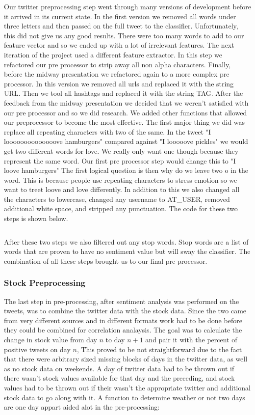 \documentclass{acm_proc_article-sp}
\begin{document}
Our twitter preprocessing step went through many versions of development before
it arrived in its current state. In the first version we removed all words
under three letters and then passed on the full tweet to the classifier.
Unfortunately, this did not give us any good results. There were too many words
to add to our feature vector and so we ended up with a lot of irrelevant
features. The next iteration of the project used a different feature extractor.
In this step we refactored our pre processor to strip away all non alpha
characters. Finally, before the midway presentation we refactored again to a
more complex pre processor. In this version we removed all urls and replaced it
with the string URL. Then we tool all hashtags and replaced it with the string
TAG. After the feedback from the midway presentation we decided that we weren't
satisfied with our pre processor and so we did research.  We added other
functions that allowed our preprocessor to become the most effective. The first
major thing we did was replace all repeating characters with two of the same.
In the tweet "I loooooooooooooove hamburgers" compared against "I looooove
pickles" we would get two different words for love. We really only want one
though because they represent the same word. Our first pre processor step would
change this to "I loove hamburgers" The first logical question is then why do
we leave two o in the word. This is because people use repeating characters to
stress emotion so we want to treet loove and love differently. In addition to
this we also changed all the characters to lowercase, changed any username to
AT\_USER, removed additional white space, and stripped any punctuation. The
code for these two steps is shown below.

\break
\inputminted{python}{examples/preTweet.py}

After these two steps we also filtered out any stop words. Stop words are a
list of words that are proven to have no sentiment value but will sway the
classifier. The combination of all these steps brought us to our final pre
processor.

\subsubsection{Stock Preprocessing}
 
 The last step in pre-processing, after sentiment analysis was performed on the
tweets, was to combine the twitter data with the stock data. Since the two came
from very different sources and in different formats work had to be done before
they could be combined for correlation analaysis. The goal was to calculate the
change in stock value from day $n$ to day $n+1$ and pair it with the percent of
positive tweets on day $n$, This proved to be not straightforward due to the
fact that there were arbitrary sized missing blocks of days in the twitter
data, as well as no stock data on weekends. A day of twitter data had to be
thrown out if there wasn't stock values available for that day and the
preceding, and stock values had to be thrown out if their wasn't the
appropriate twitter and additional stock data to go along with it. A function
to determine weather or not two days are one day appart aided alot in the
pre-processing:
\end{document}
